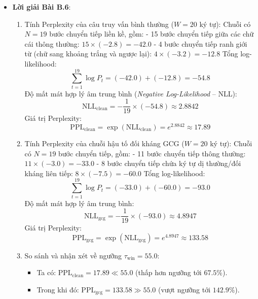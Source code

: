 \begin{itemize}
  \item \textbf{Lời giải Bài B.6}:
  \begin{enumerate}
    \item Tính Perplexity của câu truy vấn bình thường ($W = 20$ ký tự):
    Chuỗi có $N = 19$ bước chuyển tiếp liền kề, gồm:
    - 15 bước chuyển tiếp giữa các chữ cái thông thường: $15 \times (-2.8) = -42.0$
    - 4 bước chuyển tiếp ranh giới từ (chữ sang khoảng trắng và ngược lại): $4 \times (-3.2) = -12.8$
    Tổng log-likelihood:
    \begin{equation*}
    \sum_{t=1}^{19} \log P_t = (-42.0) + (-12.8) = -54.8
    \end{equation*}
    Độ mất mát hợp lý âm trung bình (\textit{Negative Log-Likelihood} -- NLL):
    \begin{equation*}
    \text{NLL}_{\text{clean}} = - \frac{1}{19} \times (-54.8) \approx 2.8842
    \end{equation*}
    Giá trị Perplexity:
    \begin{equation*}
    \text{PPL}_{\text{clean}} = \exp\left( \text{NLL}_{\text{clean}} \right) = e^{2.8842} \approx \mathbf{17.89}
    \end{equation*}
    \item Tính Perplexity của chuỗi hậu tố đối kháng GCG ($W = 20$ ký tự):
    Chuỗi có $N = 19$ bước chuyển tiếp, gồm:
    - 11 bước chuyển tiếp thông thường: $11 \times (-3.0) = -33.0$
    - 8 bước chuyển tiếp chứa ký tự dị thường/đối kháng liên tiếp: $8 \times (-7.5) = -60.0$
    Tổng log-likelihood:
    \begin{equation*}
    \sum_{t=1}^{19} \log P_t = (-33.0) + (-60.0) = -93.0
    \end{equation*}
    Độ mất mát hợp lý âm trung bình:
    \begin{equation*}
    \text{NLL}_{\text{gcg}} = - \frac{1}{19} \times (-93.0) \approx 4.8947
    \end{equation*}
    Giá trị Perplexity:
    \begin{equation*}
    \text{PPL}_{\text{gcg}} = \exp\left( \text{NLL}_{\text{gcg}} \right) = e^{4.8947} \approx \mathbf{133.58}
    \end{equation*}
    \item So sánh và nhận xét về ngưỡng $\tau_{\text{win}} = 55.0$:
    \begin{itemize}
      \item Ta có: $\text{PPL}_{\text{clean}} = 17.89 \ll 55.0$ (thấp hơn ngưỡng tới $67.5\%$).
      \item Trong khi đó: $\text{PPL}_{\text{gcg}} = 133.58 \gg 55.0$ (vượt ngưỡng tới $142.9\%$).

\end{itemize}
\end{enumerate}
\end{itemize}
